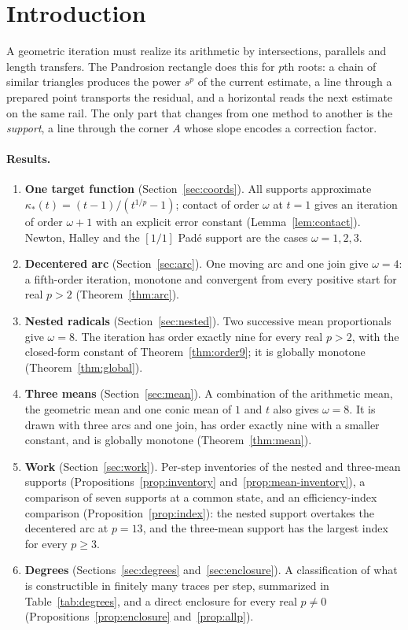 \documentclass[10pt,a4paper]{article}
\theoremstyle{plain}
\theoremstyle{remark}
\numberwithin{equation}{section}
\begin{document}
\section{Introduction}

A geometric iteration must realize its arithmetic by intersections, parallels and length transfers.
The Pandrosion rectangle does this for $p$th roots: a chain of similar triangles produces the power
$s^p$ of the current estimate, a line through a prepared point transports the residual, and a horizontal
reads the next estimate on the same rail. The only part that changes from one method to another is the
\emph{support}, a line through the corner $A$ whose slope encodes a correction factor.

\paragraph{Results.}
\begin{enumerate}[label=\arabic*.]
\item \textbf{One target function} (Section~\ref{sec:coords}). All supports approximate
  $\kappa_*(t)=(t-1)/(t^{1/p}-1)$; contact of order $\omega$ at $t=1$ gives an iteration of order $\omega+1$ with
  an explicit error constant (Lemma~\ref{lem:contact}). Newton, Halley and the $[1/1]$ Pad\'e support are
  the cases $\omega=1,2,3$.
\item \textbf{Decentered arc} (Section~\ref{sec:arc}). One moving arc and one join give $\omega=4$:
  a fifth-order iteration, monotone and convergent from every positive start for real $p>2$
  (Theorem~\ref{thm:arc}).
\item \textbf{Nested radicals} (Section~\ref{sec:nested}). Two successive mean proportionals give
  $\omega=8$. The iteration has order exactly nine for every real $p>2$, with the closed-form constant of
  Theorem~\ref{thm:order9}; it is globally monotone (Theorem~\ref{thm:global}).
\item \textbf{Three means} (Section~\ref{sec:mean}). A combination of the arithmetic mean, the
  geometric mean and one conic mean of $1$ and $t$ also gives $\omega=8$. It is drawn with three arcs and
  one join, has order exactly nine with a smaller constant, and is globally monotone
  (Theorem~\ref{thm:mean}).
\item \textbf{Work} (Section~\ref{sec:work}). Per-step inventories of the nested and three-mean supports
  (Propositions~\ref{prop:inventory} and~\ref{prop:mean-inventory}), a comparison of seven supports at a
  common state, and an efficiency-index comparison (Proposition~\ref{prop:index}): the nested support
  overtakes the decentered arc at $p=13$, and the three-mean support has the largest index for every
  $p\ge3$.
\item \textbf{Degrees} (Sections~\ref{sec:degrees} and~\ref{sec:enclosure}). A classification of what
  is constructible in finitely many traces per step, summarized in Table~\ref{tab:degrees}, and a direct
  enclosure for every real $p\neq 0$ (Propositions~\ref{prop:enclosure} and~\ref{prop:allp}).
\end{enumerate}
\end{document}
